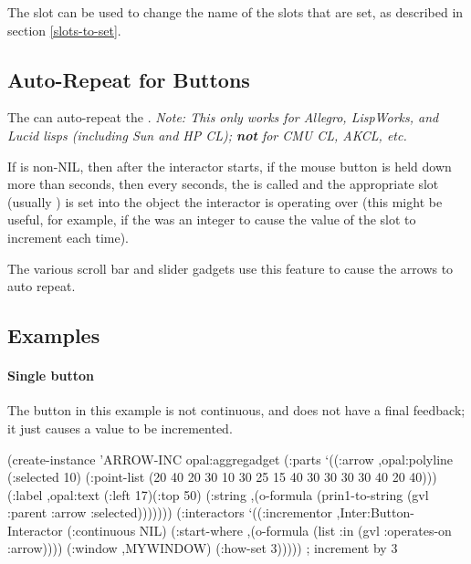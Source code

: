 The  slot can be used to change the name of the slots
that are set, as described in section \ref{slots-to-set}.



\subsection{Auto-Repeat for Buttons}

The  can auto-repeat the .
{\it Note: This only works for Allegro, LispWorks, and Lucid lisps
(including Sun and HP CL); {\bf not} for CMU CL, AKCL, etc.}

If  is non-NIL, then after the interactor starts,
if the mouse button is held down more than 
seconds, then every  seconds, the
 is called and the appropriate slot (usually
) is set into the object the interactor is operating
over (this might be useful, for example, if the  was an integer to
cause the value of the  slot to increment each time).

The various scroll bar and slider gadgets use this feature to cause the
arrows to auto repeat.



\begin{group}
\subsection{Examples}
\paragraph{Single button}
The button in this example is not continuous, and does not have a final
feedback; it just causes a value to be incremented.
\begin{programexample}
(create-instance 'ARROW-INC opal:aggregadget
   (:parts
    `((:arrow ,opal:polyline
              (:selected 10)
              (:point-list (20 40 20 30 10 30 25 15 40 30 30 30 30 40 20 40)))
      (:label ,opal:text
              (:left 17)(:top 50)
              (:string ,(o-formula (prin1-to-string
				    (gvl :parent :arrow :selected)))))))
   (:interactors
    `((:incrementor ,Inter:Button-Interactor
                    (:continuous NIL)
                    (:start-where ,(o-formula (list :in (gvl :operates-on :arrow))))
                    (:window ,MYWINDOW)
                    (:how-set 3)))))  ; increment by 3
\end{programexample}
\end{group}

